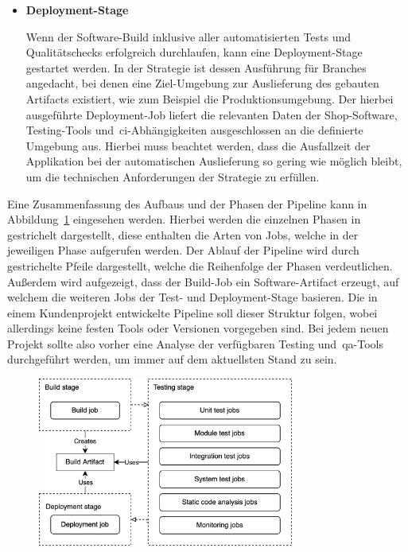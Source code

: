 \begin{itemize}
    \item {
        \textbf{Deployment-Stage}\par
        Wenn der Software-Build inklusive aller automatisierten Tests und Qualitätschecks erfolgreich durchlaufen,
        kann eine Deployment-Stage gestartet werden.
        In der Strategie ist dessen Ausführung für Branches angedacht, bei denen eine Ziel-Umgebung zur Auslieferung
        des gebauten Artifacts existiert, wie zum Beispiel die Produktionsumgebung.
        Der hierbei ausgeführte Deployment-Job liefert die relevanten Daten der Shop-Software, Testing-Tools
        und\ \acrshort{ci}-Abhängigkeiten ausgeschlossen an die definierte Umgebung aus.
        Hierbei muss beachtet werden, dass die Ausfallzeit der Applikation bei der automatischen Auslieferung so gering
        wie möglich bleibt, um die technischen Anforderungen der Strategie zu erfüllen.
    }
\end{itemize}

Eine Zusammenfassung des Aufbaus und der Phasen der Pipeline kann in Abbildung\ \ref{fig:pipeline-visualization}
eingesehen werden.
Hierbei werden die einzelnen Phasen in gestrichelt dargestellt, diese enthalten die Arten von Jobs, welche
in der jeweiligen Phase aufgerufen werden.
Der Ablauf der Pipeline wird durch gestrichelte Pfeile dargestellt, welche die Reihenfolge der Phasen verdeutlichen.
Außerdem wird aufgezeigt, dass der Build-Job ein Software-Artifact erzeugt, auf welchem die weiteren Jobs der Test- und
Deployment-Stage basieren.
Die in einem Kundenprojekt entwickelte Pipeline soll dieser Struktur folgen, wobei allerdings keine festen Tools
oder Versionen vorgegeben sind.
Bei jedem neuen Projekt sollte also vorher eine Analyse der verfügbaren Testing und\ \acrshort{qa}-Tools durchgeführt
werden, um immer auf dem aktuellsten Stand zu sein.

\begin{figure}[H]
    \centering
    \includegraphics[width=0.75\textwidth]{images/content/pipeline-visualization}
    \label{fig:pipeline-visualization}
\end{figure}

